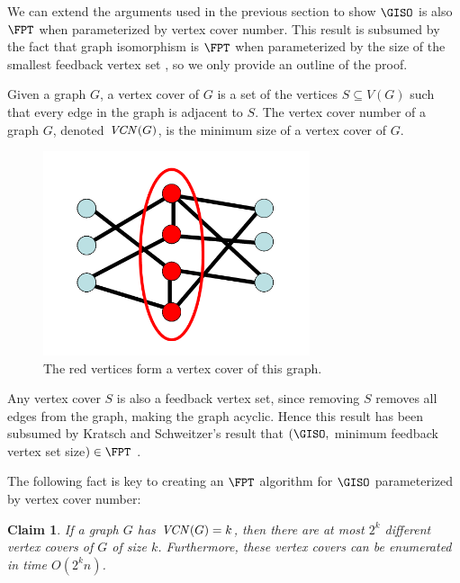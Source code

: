 \documentclass[11pt]{report}
\newtheorem{claim}{Claim}
\newcommand{\vcn}{\mbox{\emph{VCN}}}
\begin{document}
We can extend the arguments used in the previous section to show $\GISO$ is also $\FPT$ when parameterized by vertex cover number. This result is subsumed by the fact that graph isomorphism is $\FPT$ when parameterized by the size of the smallest feedback vertex set \cite{Kratsch09}, so we only provide an outline of the proof.




Given a graph $G$, a vertex cover of $G$ is a set of the vertices $S \subseteq V(G)$ such that every edge in the graph is adjacent to $S$. The vertex cover number of a graph $G$, denoted $\vcn (G)$, is the minimum size of a vertex cover of $G$.

\begin{figure}[h]
\begin{center}
\leavevmode
\includegraphics[height=60mm]{Vertex_Cover_Definition.png}
\end{center}
\caption{The red vertices form a vertex cover of this graph.}
\label{fig:image_2}
\end{figure}



Any vertex cover $S$ is also a feedback vertex set, since removing $S$ removes all edges from the graph, making the graph acyclic. Hence this result has been subsumed by Kratsch and Schweitzer's result that $(\GISO, $ minimum feedback vertex set size$)\in\FPT$ \cite{Kratsch09}.


 The following fact is key to creating an $\FPT$ algorithm for $\GISO$ parameterized by vertex cover number:


\begin{claim} If a graph $G$ has $\vcn(G)=k$, then there are at most $2^k$ different vertex covers of $G$ of size $k$. Furthermore, these vertex covers can be enumerated in time $O(2^{k} n)$.

\label{clm_vcn_enumerable_fpt}
\end{claim}
\end{document}
